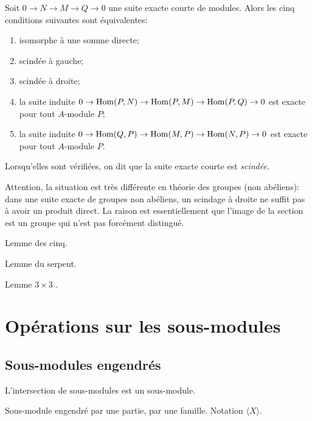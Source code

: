 \begin{propdef}
Soit $0 \to N \to M \to Q \to 0$ une suite exacte courte de modules. Alors les cinq conditions suivantes sont équivalentes:
\begin{enumerate}
\item isomorphe à une somme directe;
\item scindée à gauche;
\item scindée à droite;
\item la suite induite $0 \to \operatorname{Hom}(P,N) \to \operatorname{Hom}(P,M) \to \operatorname{Hom}(P,Q) \to 0$ est exacte pour tout $A$-module $P$;
\item  la suite induite $0 \to \operatorname{Hom}(Q,P) \to \operatorname{Hom}(M,P) \to \operatorname{Hom}(N,P) \to 0$ est exacte pour tout $A$-module $P$.
\end{enumerate}
Lorsqu'elles sont vérifiées, on dit que la suite exacte courte est \emph{scindée}.
\end{propdef}

\begin{remarque}
Attention, la situation est très différente en théorie des groupes (non abéliens): dans une suite exacte de groupes non abéliens, un scindage à droite ne suffit pas à avoir un produit direct. La raison est essentiellement que l'image de la section est un groupe qui n'est pas forcément distingué.
\end{remarque}

\begin{proposition}
Lemme des cinq.
\end{proposition}


\begin{exo}
Lemme du serpent.
\end{exo}


\begin{exo}
Lemme \og $3\times 3$ \fg.
\end{exo}
\section{Opérations sur les sous-modules}

\subsection{Sous-modules engendrés}
\begin{proposition}
L'intersection de sous-modules est un sous-module.
\end{proposition}

\begin{definition} Sous-module engendré par une partie, par une famille. Notation $\langle X\rangle$.
\end{definition}



